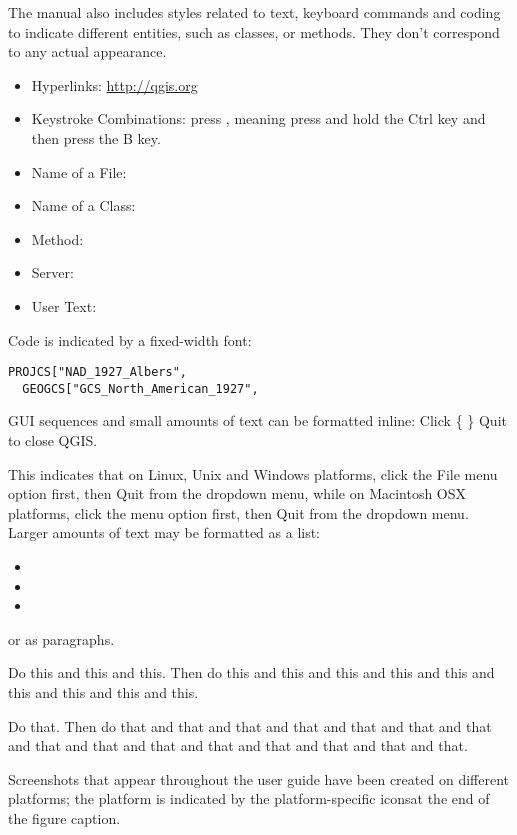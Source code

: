The manual also includes styles related to text, keyboard commands and coding to indicate different entities, such as classes, or methods. They don't correspond to any actual appearance.

\begin{itemize}[label=--]
\item Hyperlinks: \url{http://qgis.org}
\item Keystroke Combinations: press , meaning press and hold the Ctrl key and then press the B key.
\item Name of a File: 
\item Name of a Class: 
\item Method: 
\item Server: 
\item User Text: 
\end{itemize}

Code is indicated by a fixed-width font:
\begin{verbatim}
PROJCS["NAD_1927_Albers",
  GEOGCS["GCS_North_American_1927",
\end{verbatim}


GUI sequences and small amounts of text can be formatted inline: Click \{\nix{} \} \arrow Quit to close QGIS.

This indicates that on Linux, Unix and Windows platforms, click the File menu option first, then Quit from the dropdown menu, while on Macintosh OSX platforms, click the \qg menu option first, then Quit from the dropdown menu. Larger amounts of text may be formatted as a list:

\begin{itemize}
\item {}
\item {}
\item {}
\end{itemize}

or as paragraphs.

\nix{} \osx{} Do this and this and this. Then do this and this and this and this and this and this and this and this and this.

\win{}Do that. Then do that and that and that and that and that and that and that and that and that and that and that and that and that and that and that.

Screenshots that appear throughout the user guide have been created on different platforms; the platform is indicated by the platform-specific iconsat the end of the figure caption.
